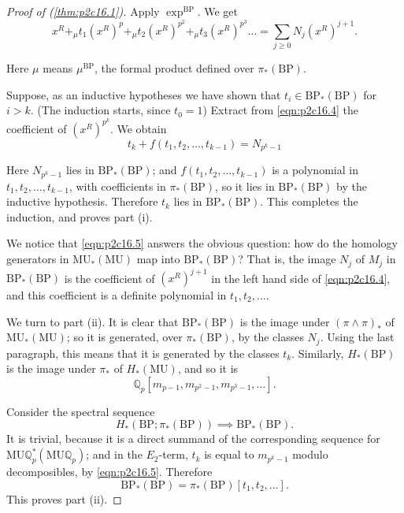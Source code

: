 \documentclass[../main]{subfiles}
\begin{document}
\begin{proof}[Proof of (\ref{thm:p2c16.1})]
Apply $\exp^{\mathrm{BP}}$. We get 
\begin{equation}
\tag{16.4}
\label{eqn:p2c16.4}
x^R +_\mu t_1 (x^R)^p +_\mu t_2 (x^R)^{p^2} +_\mu t_3 (x^R)^{p^3} \ldots = \sum_{j \ge 0} N_j (x^R)^{j + 1}.
\end{equation}

Here $\mu$ means $\mu^{\mathrm{BP}}$, the formal product defined over $\pi_*(\mathrm{BP})$.

Suppose, as an inductive hypotheses we have shown that $t_i \in \mathrm{BP}_*(\mathrm{BP})$ for $i > k$. (The induction starts, since $t_0 = 1$) Extract from \eqref{eqn:p2c16.4} the coefficient of $(x^R)^{p^k}$. We obtain
\begin{equation}
\tag{16.5}
\label{eqn:p2c16.5}
t_k + f(t_1, t_2, \ldots, t_{k - 1}) = N_{p^k - 1}
\end{equation}

Here $N_{p^k - 1}$ lies in $\mathrm{BP}_\ast(\mathrm {BP})$; and $f(t_1, t_2, \ldots, t_{k-1})$ is a polynomial in $t_1, t_2, \ldots, t_{k - 1}$, with coefficients in $\pi_\ast(\mathrm{BP})$, so it lies in $\mathrm{BP}_\ast(\mathrm{BP})$ by the inductive hypothesis. Therefore $t_k$ lies in $\mathrm {BP}_\ast(\mathrm{BP})$. This completes the induction, and proves part (i).

We notice that \eqref{eqn:p2c16.5} answers the obvious question: how do the homology generators in $\mathrm{MU}_\ast(\mathrm{MU})$ map into $\mathrm{BP}_\ast(\mathrm{BP})$? That is, the image $N_j$ of $M_j$ in $\mathrm{BP}_\ast(\mathrm{BP})$ is the coefficient of $(x^R)^{j + 1}$ in the left hand side of \eqref{eqn:p2c16.4}, and this coefficient is a definite polynomial in $t_1, t_2, \ldots$. 

We turn to part (ii). It is clear that $\mathrm {BP}_\ast (\mathrm {BP})$ is the image under $(\pi \wedge \pi)_\ast$ of $\mathrm{MU}_\ast(\mathrm{MU})$; so it is generated, over $\pi_\ast(\mathrm{BP})$, by the classes $N_j$. Using the last paragraph, this means that it is generated by the classes $t_k$. Similarly, $H_\ast(\mathrm{BP})$ is the image under $\pi_\ast$ of $H_\ast(\mathrm{MU})$, and so it is $$\mathbb Q_p[m_{p - 1}, m_{p^2 - 1}, m_{p^3 - 1}, \ldots].$$ 

Consider the spectral sequence $$H_\ast(\mathrm{BP}; \pi_\ast(\mathrm {BP})) \implies \mathrm{BP}_\ast(\mathrm{BP}).$$ It is trivial, because it is a direct summand of the corresponding sequence for $\mathrm {MU} \mathbb Q_p^\ast(\mathrm {MU} \mathbb Q_p)$; and in the $E_2$-term, $t_k$ is equal to $m_{p^k - 1}$ modulo decomposibles, by \eqref{eqn:p2c16.5}. Therefore $$\mathrm{BP}_\ast (\mathrm {BP}) = \pi_*(\mathrm {BP}) [t_1, t_2, \ldots].$$ This proves part (ii).


\end{proof}
\end{document}

